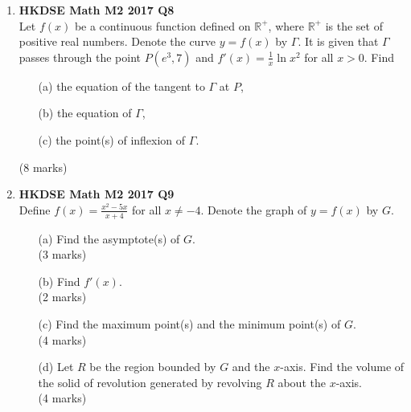 \documentclass[12pt]{article}
\begin{document}
\begin{enumerate}
	\item \textbf{HKDSE Math M2 2017 Q8}\\
	Let $f(x) $ be a continuous function defined on  $\mathbb{R} ^+$, where $\mathbb{R} ^+$ is the set of positive real numbers. Denote the curve $y = f(x)$ by  $\Gamma$. It is given that $\Gamma$ passes through the point $P(e^3 , 7)$ and $f'(x) = \displaystyle\frac{1}{x} \ln{x^2}$ for all $x>0$. Find 
	\begin{enumerate}
		\item [(a)] the equation of the tangent to $\Gamma$ at $P$,
		\item [(b)] the equation of $\Gamma$,
		\item [(c)] the point(s) of inflexion of $\Gamma$.
	\end{enumerate}
	(8 marks)

	\item \textbf{HKDSE Math M2 2017 Q9}\\
	Define $f(x) = \displaystyle\frac{x^2 - 5x}{x + 4}$ for all $x \neq -4$. Denote the graph of $y = f(x)$ by $G$. 
	\begin{enumerate}
		\item [(a)]Find the asymptote(s) of $G$.  \\(3 marks)
		\item [(b)]Find $f'(x)$. \\(2 marks) 
		\item [(c)]Find the maximum point(s) and the minimum point(s) of $G$. \\(4 marks) 
		\item [(d)]Let $R$ be the region bounded by $G$ and the $x$-axis. Find the volume of the solid of revolution generated by revolving $R$ about the $x$-axis. \\(4 marks)
	\end{enumerate}



\end{enumerate}
\end{document}
